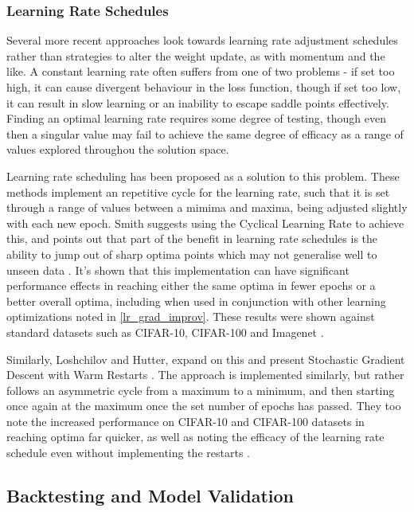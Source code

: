 \documentclass[a4paper,11pt,oneside]{article}
\theoremstyle{plain}
\theoremstyle{definition}
\begin{document}
\subsubsection{Learning Rate Schedules}

Several more recent approaches look towards learning rate adjustment schedules rather than strategies to alter the 
weight update, as with momentum and the like. A constant learning rate often suffers from one of two problems - 
if set too high, it can cause divergent behaviour in the loss function, though if set too low, it can result in slow 
learning or an inability to escape saddle points effectively. Finding an optimal learning rate requires some degree
of testing, though even then a singular value may fail to achieve the same degree of efficacy as a range of values 
explored throughou the solution space. \newline

Learning rate scheduling has been proposed as a solution to this problem. These methods implement an repetitive cycle 
for the learning rate, such that it is set through a range of values between a mimima and maxima, being adjusted slightly 
with each new epoch. Smith suggests using the Cyclical Learning Rate to achieve this, and points out that part of the benefit 
in learning rate schedules is the ability to jump out of sharp optima points which may not generalise well to unseen data \cite{Smith}. 
It's shown that this implementation can have significant performance effects in reaching either the same optima in fewer epochs or a better 
overall optima, including when used in conjunction with other learning optimizations noted in \ref{lr_grad_improv}. These results were 
shown against standard datasets such as CIFAR-10, CIFAR-100 and Imagenet \cite{Smith}. \newline

Similarly, Loshchilov and Hutter, expand on this and present Stochastic Gradient Descent with Warm Restarts \cite{Loshchilov}. The approach is 
implemented similarly, but rather follows an asymmetric cycle from a maximum to a minimum, and then starting once again at the maximum once the set number 
of epochs has passed. They too note the increased performance on CIFAR-10 and CIFAR-100 datasets in reaching optima far quicker, as well as noting the efficacy of the 
learning rate schedule even without implementing the restarts \cite{Loshchilov}.



\subsection{Backtesting and Model Validation} \label{lr_backtesting}
\hfill
\end{document}
